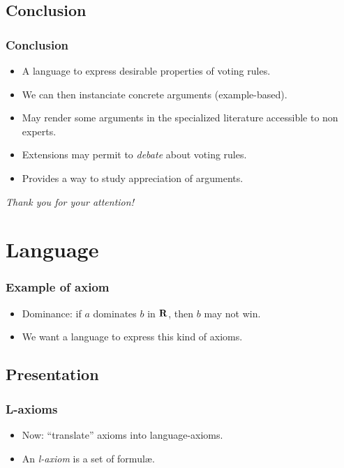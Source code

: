 \documentclass[english]{beamer}
\begin{document}
\subsection{Conclusion}
\begin{frame}
	\frametitle{Conclusion}
	
	\begin{itemize}
		\item A language to express desirable properties of voting rules.
		\item We can then instanciate concrete arguments (example-based).
		\item May render some arguments in the specialized literature accessible to non experts.
		\item Extensions may permit to \emph{debate} about voting rules.
		\item Provides a way to study appreciation of arguments.
	\end{itemize}
\end{frame}

\begin{frame}[plain]
	\addtocounter{framenumber}{-1}
	\begin{center}
		\huge
		\textit{Thank you for your attention!}
	\end{center}
\end{frame}

\appendix
\AtBeginSection{
}

\section{Language}
\begin{frame}
	\frametitle{Example of axiom}
	
	\begin{itemize}
		\item Dominance: if $a$ dominates $b$ in $\mathbf{R}$, then $b$ may not win.
		\item We want a language to express this kind of axioms.
	\end{itemize}
\end{frame}

\subsection{Presentation}
\begin{frame}
	\frametitle{L-axioms}
	
	\begin{itemize}
		\item Now: “translate” axioms into language-axioms.
		\item An \emph{l-axiom} is a set of formulæ.
	\end{itemize}
\end{frame}
\end{document}
